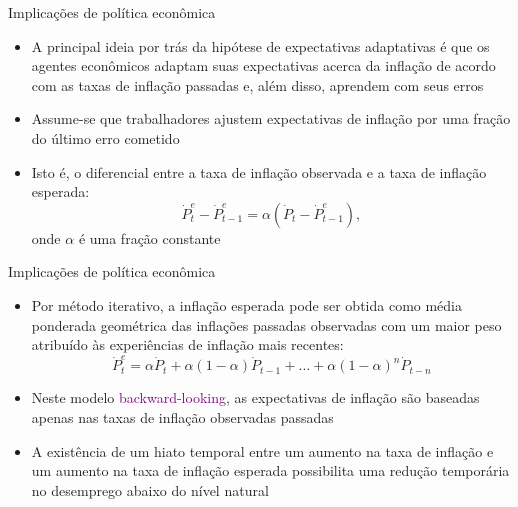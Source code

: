 \documentclass[10pt]{beamer}
\begin{document}
\begin{frame}{Implicações de política econômica}
    \begin{itemize}
        \item A principal ideia por trás da hipótese de expectativas adaptativas é que os agentes econômicos adaptam suas expectativas acerca da inflação de acordo com as taxas de inflação passadas e, além disso, aprendem com seus erros
        \bigskip
        \item Assume-se que trabalhadores ajustem expectativas de inflação por uma fração do último erro cometido
        \bigskip
        \item Isto é, o diferencial entre a taxa de inflação observada e a taxa de inflação esperada:
        \begin{equation}
            \dot{P}_t^e - \dot{P}_{t-1}^e = \alpha (\dot{P}_t - \dot{P}_{t-1}^e),
            \label{eq3}
        \end{equation}
        onde $\alpha$ é uma fração constante
    \end{itemize}    
\end{frame}

\begin{frame}{Implicações de política econômica}
    \begin{itemize}
        \item Por método iterativo, a inflação esperada  pode ser obtida como média ponderada geométrica das inflações passadas observadas com um maior peso atribuído às experiências de inflação mais recentes:
        \begin{equation}
            \dot{P}_t^e = \alpha \dot{P}_t + \alpha(1-\alpha)\dot{P}_{t-1} + \dots + \alpha(1-\alpha)^n\dot{P}_{t-n}
            \label{eq4}
        \end{equation}
        \bigskip
        \item Neste modelo \textcolor{purple}{backward-looking}, as expectativas de inflação são baseadas apenas nas taxas de inflação observadas passadas
        \bigskip
        \item A existência de um hiato temporal entre um aumento na taxa de inflação e um aumento na taxa de inflação esperada possibilita uma redução temporária no desemprego abaixo do nível natural
    \end{itemize}    
\end{frame}
\end{document}
